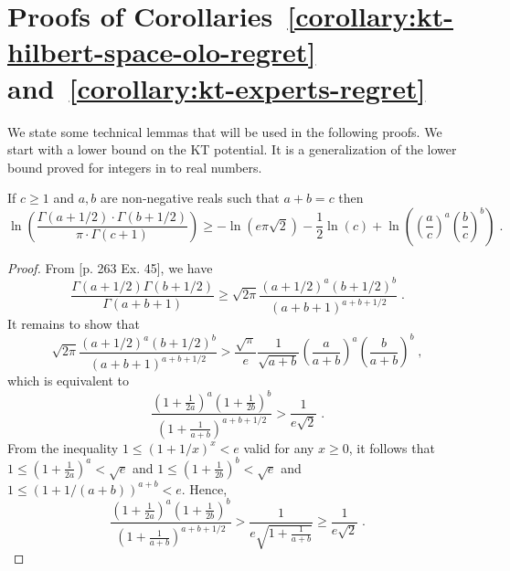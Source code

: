 \section{Proofs of Corollaries~\ref{corollary:kt-hilbert-space-olo-regret} and~\ref{corollary:kt-experts-regret}}
\label{section:corollaries_reductions}

We state some technical lemmas that will be used in the following proofs. We
start with a lower bound on the \ac{KT} potential. It is a generalization of the
lower bound proved for integers in \citet{WillemsST95} to real numbers.

\begin{lemma}
\label{lemma:approx_gamma_real}
If $c \ge 1$ and $a,b$ are non-negative reals such that $a + b = c$ then
$$
\ln \left(\frac{\Gamma(a + 1/2) \cdot \Gamma(b + 1/2)}{\pi \cdot \Gamma(c+1)} \right)
\ge - \ln(e \pi \sqrt{2}) -\frac{1}{2} \ln(c) +\ln \left(\left( \frac{a}{c} \right)^a \left( \frac{b}{c} \right)^b\right) \; .
$$
\end{lemma}
%
\begin{proof}
From \cite{WhittakerW27}[p. 263 Ex. 45], we have
\[
\frac{\Gamma(a+1/2)\Gamma(b+1/2)}{\Gamma(a+b+1)} \ge \sqrt{2\pi} \frac{(a+1/2)^a (b+1/2)^b}{(a+b+1)^{a+b+1/2}} \; .
\]
It remains to show that
$$
\sqrt{2\pi} \frac{(a+1/2)^a (b+1/2)^b}{(a+b+1)^{a+b+1/2}} > \frac{\sqrt{\pi}}{e} \frac{1}{\sqrt{a+b}} \left( \frac{a}{a+b} \right)^a \left( \frac{b}{a+b} \right)^b \; ,
$$
which is equivalent to
$$
\frac{(1+\frac{1}{2a})^a (1+\frac{1}{2b})^b}{(1+\frac{1}{a+b})^{a+b+1/2}} > \frac{1}{e\sqrt{2}} \; .
$$
From the inequality $1 \le (1+1/x)^x < e$ valid for any $x \ge 0$, it follows
that $1 \le (1+\frac{1}{2a})^a < \sqrt{e}$ and $1 \le (1+\frac{1}{2b})^b < \sqrt{e}$
and $1 \le (1+1/(a+b))^{a+b} < e$. Hence,
$$
\frac{(1+\frac{1}{2a})^a (1+\frac{1}{2b})^b}{(1+\frac{1}{a+b})^{a+b+1/2}}
> \frac{1}{e \sqrt{1 + \frac{1}{a+b}}}
\ge \frac{1}{e \sqrt{2}} \; .
$$
\end{proof}


